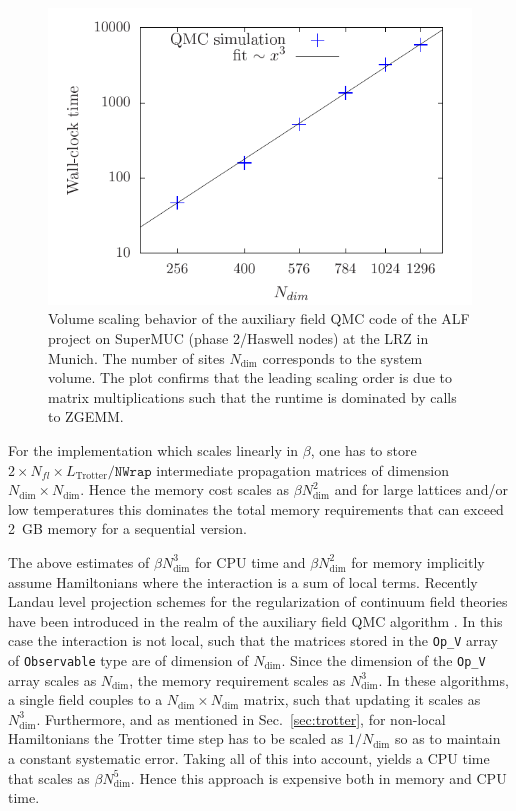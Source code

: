 \begin{figure}[h]
	\begin{center}
		\includegraphics[scale=.8]{Figures/Size_scaling_ALF_2.pdf}
	\end{center}
	\caption{\label{fig_scaling_size}Volume scaling behavior of the auxiliary field QMC code of the ALF project on SuperMUC (phase 2/Haswell nodes) at the LRZ in Munich. The number of sites $N_{\text{dim}}$ corresponds to the system volume.
	The plot confirms that the leading scaling order is due to matrix multiplications such that the runtime is dominated by calls to ZGEMM. }
\end{figure}

For the implementation which scales linearly in $\beta$, one has to store $2\times N_{fl} \times L_{\text{Trotter}}/\texttt{NWrap}$ intermediate propagation matrices of dimension $N_{\text{dim}}\times N_{\text{dim}}$.   
Hence the memory cost scales as $ \beta N_{\text{dim}}^2$ and for  large lattices and/or low temperatures this dominates the total memory requirements that can exceed 2~GB memory for a sequential version.   

The above estimates of $\beta N_{\text{dim}}^3 $ for CPU time and $\beta N_{\text{dim}}^2 $ for memory implicitly assume Hamiltonians where the interaction  is a sum of local terms.  
Recently  Landau level projection schemes for the   regularization of continuum field theories have been introduced in the realm of the auxiliary field QMC algorithm  \cite{Ippoliti18,WangZ20}. In  this case the interaction is not local,  such that the matrices stored in  the   \texttt{Op\_V} array  of \texttt{Observable} type   are of dimension of $N_{\text{dim}}$. Since the  dimension of the  \texttt{Op\_V}   array scales as $N_{\text{dim}}$, the memory  requirement scales as $N_{\text{dim}}^3$.    In these algorithms, a single field couples to a $N_{\text{dim}} \times  N_{\text{dim}} $ matrix, such that updating  it scales as $ N_{\text{dim}}^3$.  Furthermore, and as mentioned in Sec.~\ref{sec:trotter}, for non-local  Hamiltonians the  Trotter time step has to be scaled   as $1/N_{\text{dim}}$ so as to maintain a constant systematic error.  Taking all of this into account,    yields a CPU time that scales as $\beta N_{\text{dim}}^5$.    Hence  this approach  is expensive both in memory and CPU time. 

